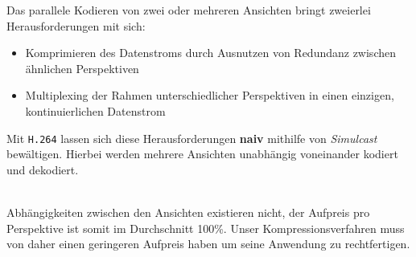 Das parallele Kodieren von zwei oder mehreren Ansichten bringt zweierlei Herausforderungen mit sich:
\begin{itemize}
    \item Komprimieren des Datenstroms durch Ausnutzen von Redundanz zwischen ähnlichen Perspektiven
    \item Multiplexing der Rahmen unterschiedlicher Perspektiven in einen einzigen, kontinuierlichen Datenstrom
\end{itemize}

\noindent Mit \texttt{H.264} lassen sich diese Herausforderungen \textbf{naiv} mithilfe von \textit{Simulcast}
bew\"altigen.
Hierbei werden mehrere Ansichten unabh\"angig voneinander kodiert und dekodiert.

\noindent\\ Abh\"angigkeiten zwischen den Ansichten existieren nicht, der Aufpreis pro Perspektive ist somit im
Durchschnitt 100\%.
Unser Kompressionsverfahren muss von daher einen geringeren Aufpreis haben um seine Anwendung zu rechtfertigen.
